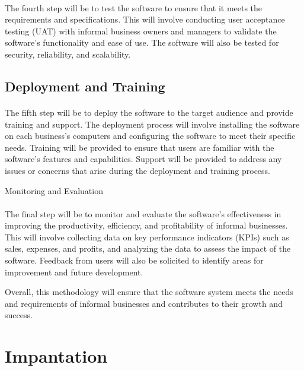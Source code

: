 \documentclass{article}
\begin{document}
\paragraph*{}
The fourth step will be to test the software to ensure that it meets the requirements and specifications. This will involve conducting user acceptance testing (UAT) with informal business owners and managers to validate the software's functionality and ease of use. The software will also be tested for security, reliability, and scalability.

\subsection*{Deployment and Training}
\paragraph*{}
The fifth step will be to deploy the software to the target audience and provide training and support. The deployment process will involve installing the software on each business's computers and configuring the software to meet their specific needs. Training will be provided to ensure that users are familiar with the software's features and capabilities. Support will be provided to address any issues or concerns that arise during the deployment and training process.

Monitoring and Evaluation
\paragraph*{}
The final step will be to monitor and evaluate the software's effectiveness in improving the productivity, efficiency, and profitability of informal businesses. This will involve collecting data on key performance indicators (KPIs) such as sales, expenses, and profits, and analyzing the data to assess the impact of the software. Feedback from users will also be solicited to identify areas for improvement and future development.

Overall, this methodology will ensure that the software system meets the needs and requirements of informal businesses and contributes to their growth and success.
\newpage


\section*{Impantation}
\lipsum[1-2]
\newpage


\end{document}
